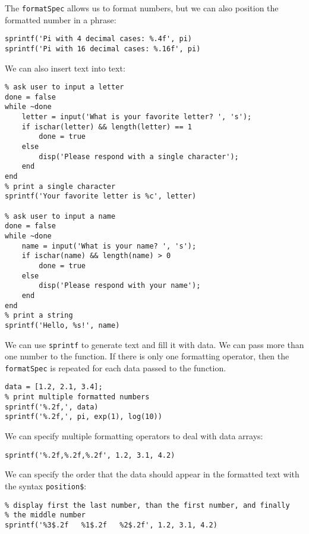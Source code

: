 \documentclass[12pt, a4paper]{article}
\begin{document}
The \texttt{formatSpec} allows us to format numbers, but we can also position the formatted number in a phrase:
\lstset{language=matlab,label= ,caption= ,captionpos=b,firstnumber=1,numbers=left,style=Matlab-editor}
\begin{lstlisting}
sprintf('Pi with 4 decimal cases: %.4f', pi)
sprintf('Pi with 16 decimal cases: %.16f', pi)
\end{lstlisting}
We can also insert text into text:
\lstset{language=matlab,label= ,caption= ,captionpos=b,firstnumber=1,numbers=left,style=Matlab-editor}
\begin{lstlisting}
% ask user to input a letter
done = false
while ~done
    letter = input('What is your favorite letter? ', 's');
    if ischar(letter) && length(letter) == 1
        done = true
    else
        disp('Please respond with a single character');
    end
end
% print a single character
sprintf('Your favorite letter is %c', letter)

% ask user to input a name
done = false
while ~done
    name = input('What is your name? ', 's');
    if ischar(name) && length(name) > 0
        done = true
    else
        disp('Please respond with your name');
    end
end
% print a string
sprintf('Hello, %s!', name)
\end{lstlisting}

We can use \texttt{sprintf} to generate text and fill it with data.
We can pass more than one number to the function.
If there is only one formatting operator, then the \texttt{formatSpec} is repeated for each data passed to the function.
\lstset{language=matlab,label= ,caption= ,captionpos=b,firstnumber=1,numbers=left,style=Matlab-editor}
\begin{lstlisting}
data = [1.2, 2.1, 3.4];
% print multiple formatted numbers
sprintf('%.2f,', data)
sprintf('%.2f,', pi, exp(1), log(10))
\end{lstlisting}

We can specify multiple formatting operators to deal with data arrays:
\lstset{language=matlab,label= ,caption= ,captionpos=b,firstnumber=1,numbers=left,style=Matlab-editor}
\begin{lstlisting}
sprintf('%.2f,%.2f,%.2f', 1.2, 3.1, 4.2)
\end{lstlisting}

We can specify the order that the data should appear in the formatted text with the syntax \texttt{position\$}:
\lstset{language=matlab,label= ,caption= ,captionpos=b,firstnumber=1,numbers=left,style=Matlab-editor}
\begin{lstlisting}
% display first the last number, than the first number, and finally
% the middle number
sprintf('%3$.2f   %1$.2f   %2$.2f', 1.2, 3.1, 4.2)
\end{lstlisting}
\end{document}
